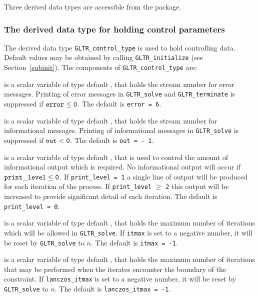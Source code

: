 \documentclass{galahad}
\newcommand{\packagename}{GL\-TR}
\begin{document}

\galtypes
Three derived data types are accessible from the package.


\subsubsection{The derived data type for holding control
 parameters}\label{typecontrol}
The derived data type
{\tt \packagename\_control\_type}
is used to hold controlling data. Default values may be obtained by calling
{\tt \packagename\_initialize}
(see Section~\ref{subinit}). The components of
{\tt \packagename\_control\_type}
are:

\begin{description}
 is a scalar variable of type default \integer, that holds the
stream number for error messages.
Printing of error messages in
{\tt \packagename\_solve} and {\tt \packagename\_terminate}
is suppressed if ${\tt error} \leq {\tt 0}$.
The default is {\tt error = 6}.

 is a scalar variable of type default \integer, that holds the
stream number for informational messages.
Printing of informational messages in
{\tt \packagename\_solve} is suppressed if ${\tt out} < {\tt 0}$.
The default is {\tt out = - 1}.

 is a scalar variable of type default \integer,
that is used
to control the amount of informational output which is required. No
informational output will occur if ${\tt print\_level} \leq {\tt 0}$. If
{\tt print\_level = 1} a single line of output will be produced for each
iteration of the process. If {\tt print\_level} $\geq$ {\tt 2} this output
will be increased to provide significant detail of each iteration.
The default is {\tt print\_level = 0}.

 is a scalar variable of type default \integer, that holds the
maximum number of iterations which will be allowed in
{\tt \packagename\_solve}.
If {\tt itmax} is set to a negative number, it will be reset by
{\tt \packagename\_solve} to $n$.
The default is {\tt itmax = -1}.

 is a scalar variable of type default \integer,
that holds the
maximum number of iterations that may be performed when the iterates
encounter the boundary of the constraint.
If {\tt lanczos\_itmax} is set to a negative number, it will be reset by
{\tt \packagename\_solve} to $n$.
The default is {\tt lanczos\_itmax = -1}.


\end{description}
\end{document}
